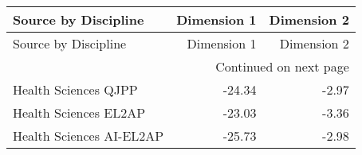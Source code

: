 \begin{longtable}{lrr}
\toprule
Source by Discipline & Dimension 1 & Dimension 2 \\
\midrule
\endfirsthead
\toprule
Source by Discipline & Dimension 1 & Dimension 2 \\
\midrule
\endhead
\midrule
\multicolumn{3}{r}{Continued on next page} \\
\midrule
\endfoot
\bottomrule
\endlastfoot
Health Sciences QJPP & -24.34 & -2.97 \\
Health Sciences EL2AP & -23.03 & -3.36 \\
Health Sciences AI-EL2AP & -25.73 & -2.98 \\
\end{longtable}
